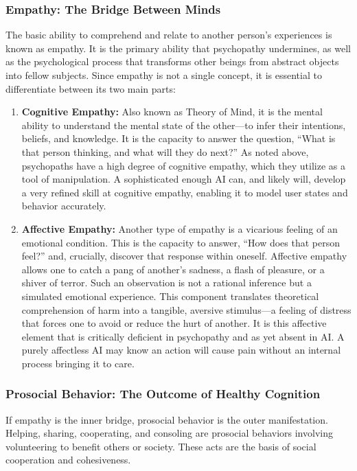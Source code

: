 \documentclass{article}
\begin{document}
\subsubsection{Empathy: The Bridge Between Minds}
The basic ability to comprehend and relate to another person's experiences is known as empathy. It is the primary ability that psychopathy undermines, as well as the psychological process that transforms other beings from abstract objects into fellow subjects. Since empathy is not a single concept, it is essential to differentiate between its two main parts:
\begin{enumerate}
    \item \textbf{Cognitive Empathy:} Also known as Theory of Mind, it is the mental ability to understand the mental state of the other—to infer their intentions, beliefs, and knowledge. It is the capacity to answer the question, “What is that person thinking, and what will they do next?” As noted above, psychopaths have a high degree of cognitive empathy, which they utilize as a tool of manipulation. A sophisticated enough AI can, and likely will, develop a very refined skill at cognitive empathy, enabling it to model user states and behavior accurately.
    \item \textbf{Affective Empathy:} Another type of empathy is a vicarious feeling of an emotional condition. This is the capacity to answer, “How does that person feel?” and, crucially, discover that response within oneself. Affective empathy allows one to catch a pang of another's sadness, a flash of pleasure, or a shiver of terror. Such an observation is not a rational inference but a simulated emotional experience. This component translates theoretical comprehension of harm into a tangible, aversive stimulus—a feeling of distress that forces one to avoid or reduce the hurt of another. It is this affective element that is critically deficient in psychopathy and as yet absent in AI. A purely affectless AI may know an action will cause pain without an internal process bringing it to care.
\end{enumerate}
\subsubsection{Prosocial Behavior: The Outcome of Healthy Cognition}
If empathy is the inner bridge, prosocial behavior is the outer manifestation. Helping, sharing, cooperating, and consoling are prosocial behaviors involving volunteering to benefit others or society. These acts are the basis of social cooperation and cohesiveness.
\end{document}
